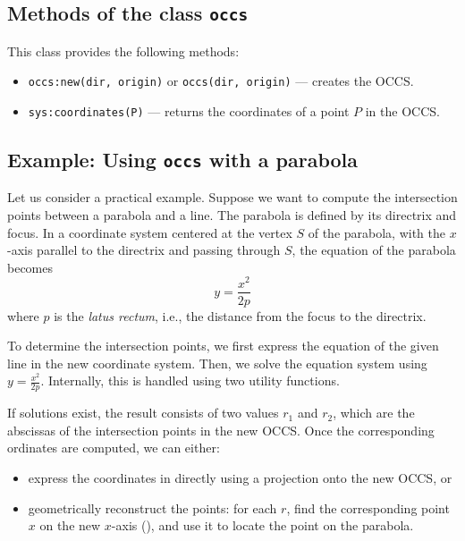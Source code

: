 
\subsection{Methods of the class \texttt{occs}} %
\label{sub:methods_of_the_class_occs}

This class provides the following methods:

\begin{itemize}
  \item \texttt{occs:new(dir, origin)} or \texttt{occs(dir, origin)} — creates the OCCS.
  \item \texttt{sys:coordinates(P)} — returns the coordinates of a point $P$ in the OCCS.
\end{itemize}


\subsection{Example: Using \texttt{occs} with a parabola} %
\label{sub:example_occs_parabola}


Let us consider a practical example. Suppose we want to compute the intersection points between a parabola and a line. The parabola is defined by its directrix and focus. In a coordinate system centered at the vertex $S$ of the parabola, with the $x$-axis parallel to the directrix and passing through $S$, the equation of the parabola becomes
\[
y = \frac{x^2}{2p}
\]
where $p$ is the \emph{latus rectum}, i.e., the distance from the focus to the directrix.

\vspace{1em}

To determine the intersection points, we first express the equation of the given line in the new coordinate system. Then, we solve the equation system using $y = \frac{x^2}{2p}$. Internally, this is handled using two utility functions.

\vspace{1em}

If solutions exist, the result consists of two values $r_1$ and $r_2$, which are the abscissas of the intersection points in the new OCCS. Once the corresponding ordinates are computed, we can either:
\begin{itemize}
  \item express the coordinates in \TIKZ{} directly using a projection onto the new OCCS, or
  \item geometrically reconstruct the points: for each $r$, find the corresponding point $x$ on the new $x$-axis (), and use it to locate the point on the parabola.
\end{itemize}

